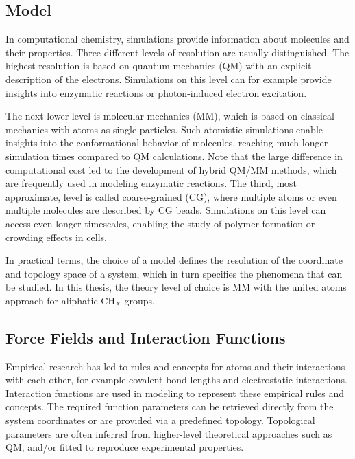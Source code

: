\subsection{Model}
In computational chemistry, simulations provide information about molecules and their properties. Three different levels of resolution are usually distinguished.\cite{Barros2022}
The highest resolution is based on quantum mechanics (QM) with an explicit description of the electrons.\cite{Senn2009} Simulations on this level can for example provide insights into enzymatic reactions \cite{Sheng2020, Kazemi2015, Ryde2003,Naray2003} or photon-induced electron excitation\cite{Rivera2019, Li2008, Askerka2017}.  

The next lower level is molecular mechanics (MM), which is based on classical mechanics with atoms as single particles. Such atomistic simulations enable insights into the conformational behavior of molecules, \cite{Witek2016, Wang2021, Schenkmayerova2021, Mccammon1977} reaching much longer simulation times compared to QM calculations. Note that the large difference in computational cost led to the development of hybrid QM/MM methods, which are frequently used in modeling enzymatic reactions.\cite{Senn2009}
The third, most approximate, level is called coarse-grained (CG), where multiple atoms or even multiple molecules are described by CG beads.\cite{Tozzini2005} Simulations on this level can access even longer timescales, enabling the study of polymer formation \cite{Hyeon2011, Shen2009} or crowding effects in cells\cite{Hong2020, Friedel2003}. 

In practical terms, the choice of a model defines the resolution of the coordinate and topology space of a system, which in turn specifies the phenomena that can be studied. In this thesis, the theory level of choice is MM with the united atoms approach\cite{Daura1998} for aliphatic CH$_X$ groups. 

\subsection{Force Fields and Interaction Functions}
Empirical research has led to rules and concepts for atoms and their interactions with each other, for example covalent bond lengths and electrostatic interactions.\cite{Morse1929, Pauling1934, Gillmor2017} 
Interaction functions are used in modeling to represent these empirical rules and concepts. The required function parameters can be retrieved directly from the system coordinates or are provided via a predefined topology.  \cite{Mackerell2004, Cornell1995, Oostenbrink2004} 
Topological parameters are often inferred from higher-level theoretical approaches such as QM, and/or fitted to reproduce experimental properties. \cite{Ponder2003, Oostenbrink2004, Jorgensen2005, Riniker2018}

